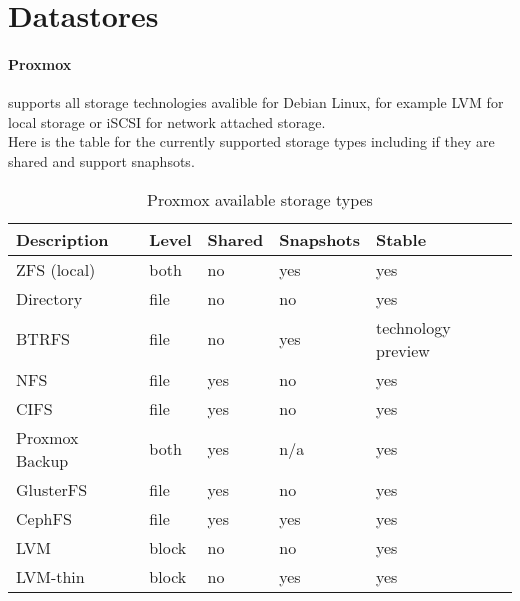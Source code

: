 \section{Datastores}

\paragraph{Proxmox} supports all storage technologies avalible for Debian Linux, for example LVM for local storage or iSCSI for network attached storage.
\\
Here is the table for the currently supported storage types including if they are shared and support snaphsots.

\begin{table}[H]
    \label{tab:storageTable}
    \centering
    \caption{Proxmox available storage types}
    \begin{tabular}{|l|l|l|l|l|}
        \hline
        \textbf{Description} & \textbf{Level} & \textbf{Shared} & \textbf{Snapshots} & \textbf{Stable} \\ \hline
        ZFS (local)           & both           & no              & yes                & yes             \\ \hline
        Directory             & file           & no              & no                 & yes             \\ \hline
        BTRFS                 & file           & no              & yes                & technology preview \\ \hline
        NFS                   & file           & yes             & no                 & yes             \\ \hline
        CIFS                  & file           & yes             & no                 & yes             \\ \hline
        Proxmox Backup        & both           & yes             & n/a                & yes             \\ \hline
        GlusterFS             & file           & yes             & no                 & yes             \\ \hline
        CephFS                & file           & yes             & yes                & yes             \\ \hline
        LVM                   & block          & no              & no                 & yes             \\ \hline
        LVM-thin              & block          & no              & yes                & yes             \\ \hline

\end{tabular}
\end{table}

